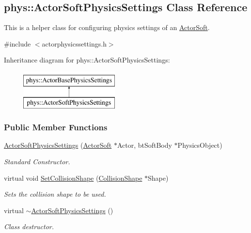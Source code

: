 \hypertarget{classphys_1_1ActorSoftPhysicsSettings}{
\subsection{phys::ActorSoftPhysicsSettings Class Reference}
\label{classphys_1_1ActorSoftPhysicsSettings}
}


This is a helper class for configuring physics settings of an \hyperlink{classphys_1_1ActorSoft}{ActorSoft}.  




{\ttfamily \#include $<$actorphysicssettings.h$>$}

Inheritance diagram for phys::ActorSoftPhysicsSettings:\begin{figure}[H]
\begin{center}
\leavevmode
\includegraphics[height=2.000000cm]{classphys_1_1ActorSoftPhysicsSettings}
\end{center}
\end{figure}
\subsubsection*{Public Member Functions}
\begin{DoxyCompactItemize}
\item 
\hyperlink{classphys_1_1ActorSoftPhysicsSettings_a4b5f0d9f1f4c36b3d429528cfbacf35c}{ActorSoftPhysicsSettings} (\hyperlink{classphys_1_1ActorSoft}{ActorSoft} $\ast$Actor, btSoftBody $\ast$PhysicsObject)
\begin{DoxyCompactList}\small\item\em Standard Constructor. \item\end{DoxyCompactList}\item 
virtual void \hyperlink{classphys_1_1ActorSoftPhysicsSettings_a76c3dfd03a822463d577f76fc9095a89}{SetCollisionShape} (\hyperlink{classphys_1_1CollisionShape}{CollisionShape} $\ast$Shape)
\begin{DoxyCompactList}\small\item\em Sets the collision shape to be used. \item\end{DoxyCompactList}\item 
\hypertarget{classphys_1_1ActorSoftPhysicsSettings_a9728c78b1bd9a7c1bc2c35619bc01a4a}{
virtual \hyperlink{classphys_1_1ActorSoftPhysicsSettings_a9728c78b1bd9a7c1bc2c35619bc01a4a}{$\sim$ActorSoftPhysicsSettings} ()}
\label{classphys_1_1ActorSoftPhysicsSettings_a9728c78b1bd9a7c1bc2c35619bc01a4a}

\begin{DoxyCompactList}\small\item\em Class destructor. \item\end{DoxyCompactList}\end{DoxyCompactItemize}
